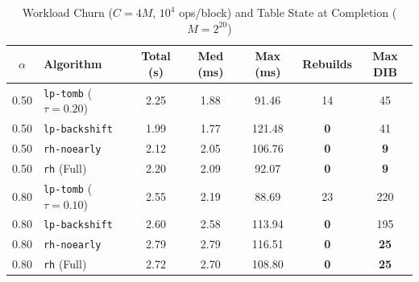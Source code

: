 \documentclass[conference]{IEEEtran}
\begin{document}
\begin{table}[htbp]
\caption{Workload Churn ($C=4M$, $10^4$ ops/block) and Table State at Completion ($M=2^{20}$)}
\label{tab:rq3_workload_profiling}
\centering
\begin{tabular}{|c|l|c|c|c|c|c|}
\hline
\textbf{$\alpha$} & \textbf{Algorithm} & \textbf{Total (s)} & \textbf{Med (ms)} & \textbf{Max (ms)} & \textbf{Rebuilds} & \textbf{Max DIB} \\
\hline
0.50 & \texttt{lp-tomb} ($\tau=0.20$) & 2.25 & 1.88 & 91.46 & 14 & 45 \\
0.50 & \texttt{lp-backshift}          & 1.99 & 1.77 & 121.48 & \textbf{0} & 41 \\
0.50 & \texttt{rh-noearly}            & 2.12 & 2.05 & 106.76 & \textbf{0} & \textbf{9} \\
0.50 & \texttt{rh} (Full)             & 2.20 & 2.09 & 92.07 & \textbf{0} & \textbf{9} \\
\hline
0.80 & \texttt{lp-tomb} ($\tau=0.10$) & 2.55 & 2.19 & 88.69 & 23 & 220 \\
0.80 & \texttt{lp-backshift}          & 2.60 & 2.58 & 113.94 & \textbf{0} & 195 \\
0.80 & \texttt{rh-noearly}            & 2.79 & 2.79 & 116.51 & \textbf{0} & \textbf{25} \\
0.80 & \texttt{rh} (Full)             & 2.72 & 2.70 & 108.80 & \textbf{0} & \textbf{25} \\
\hline
\end{tabular}
\end{table}
\end{document}
